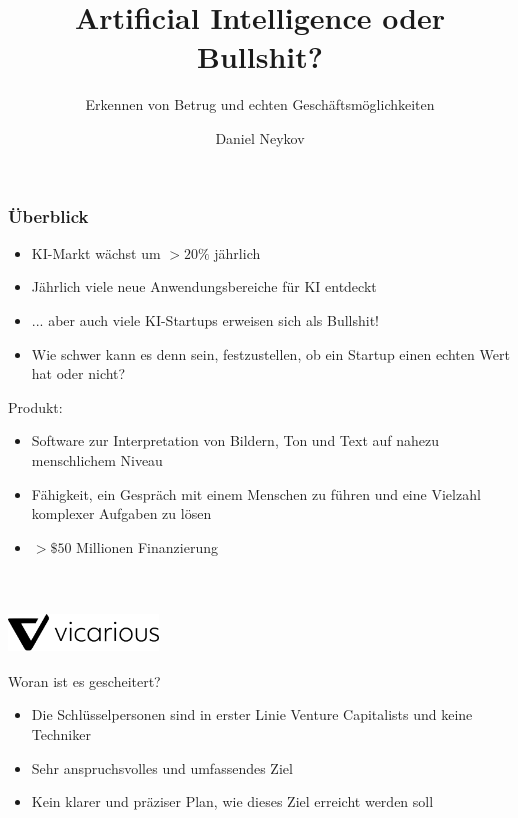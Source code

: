\documentclass{beamer}
\title{Artificial Intelligence oder Bullshit?}
\subtitle{Erkennen von Betrug und echten Geschäftsmöglichkeiten}
\author{Daniel Neykov}
\begin{document}
\frame{\titlepage}

\begin{frame}
\frametitle{Überblick}

\begin{itemize}
    \item<1-> KI-Markt wächst um $>20\%$ jährlich
    \item<2-> Jährlich viele neue Anwendungsbereiche für KI entdeckt
    \item<3-> ... aber auch viele KI-Startups erweisen sich als Bullshit!
    \item<4-> Wie schwer kann es denn sein, festzustellen, ob ein Startup einen echten Wert hat oder nicht?
\end{itemize}
\end{frame}

\begin{frame}
    Produkt: \\
    \begin{itemize}
        \item<1-> Software zur Interpretation von Bildern, Ton und Text auf nahezu menschlichem Niveau
        \item<2-> Fähigkeit, ein Gespräch mit einem Menschen zu führen und eine Vielzahl komplexer Aufgaben zu lösen
        \item<3-> $>\$50$ Millionen Finanzierung
    \end{itemize} ~\\
\end{frame}

\begin{frame}
    \frametitle{\includegraphics[width=0.3\textwidth]{vicarious.png}}
    Woran ist es gescheitert? \\
    \begin{itemize}
        \item<1-> Die Schlüsselpersonen sind in erster Linie Venture Capitalists und keine Techniker
        \item<2-> Sehr anspruchsvolles und umfassendes Ziel
        \item<3-> Kein klarer und präziser Plan, wie dieses Ziel erreicht werden soll
    \end{itemize} ~\\
\end{frame}
\end{document}
